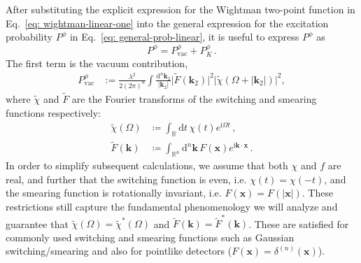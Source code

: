 \documentclass[prd,twocolumn,superscriptaddress,nofootinbib,floatfix,amsmath,amssymb]{revtex4-2}
\newcommand{\ii}{\mathrm{i}}
\newcommand{\bx}{\bm{x}}
\newcommand{\bk}{{\bm{k}}}
\newcommand{\dd}{\textrm{d}}
\newcommand{\vac}{\text{vac}}
\begin{document}
    After substituting the explicit expression for the Wightman two-point function in Eq.~\eqref{eq: wightman-linear-one} into the general expression for the excitation probability $P^\phi$ in Eq.~\eqref{eq: general-prob-linear}, it is useful to express  $P^\phi$ as 
    \begin{equation}
        P^\phi = P^\phi_{\vac}+P^\phi_K\,.
        \label{eq: prob-linear-schematic}
    \end{equation}
    The first term is the vacuum contribution,
    \begin{align}
        P_{\vac}^{\phi} &:= \frac{\lambda^2}{2(2\pi)^n}\int\frac{{\dd}^n \bm{k}_2}{|\bm{k}_2|} \bigr|\tilde{F}(\bm{k}_2)\bigr|^2  \bigr|\tilde{\chi}\left(\Omega+|\bm{k}_2|\right)\bigr|^2,
        \label{eq:linearvacuum}
    \end{align}
    where $\tilde\chi$ and $\tilde{F}$ are the Fourier transforms of the switching and smearing functions respectively:
    \begin{equation}
    \begin{split}
   	    \tilde \chi(\Omega)&\coloneqq\int_\mathbb{R}\!\dd t\, \chi(t)e^{\ii \Omega t}\,,\\
        \tilde F(\bm k) &\coloneqq\int_{\mathbb{R}^n}\!\!\dd^n \bm k\, F(\bm x)e^{\ii \bm k\cdot\bm x}\,.
   	    \label{eq: Fourier-transform}
    	\end{split}
    \end{equation}
    In order to simplify subsequent calculations, we assume that both $\chi$ and $f$ are real, and further that the switching function is even, i.e. $\chi(t) = \chi(-t)$, and the smearing function is  rotationally invariant, i.e. $F(\bx) = F(|\bx|)$. These restrictions still capture the fundamental phenomenology we will analyze and  guarantee that $\tilde{\chi}(\Omega) = \tilde\chi^*(\Omega) $ and $\tilde{F}(\bk) = \tilde{F}^*(\bk)$. These are satisfied for commonly used switching and smearing functions such as Gaussian switching/smearing and also for pointlike detectors ($F(\bx) = \delta^{(n)}(\bx)$).
\end{document}
